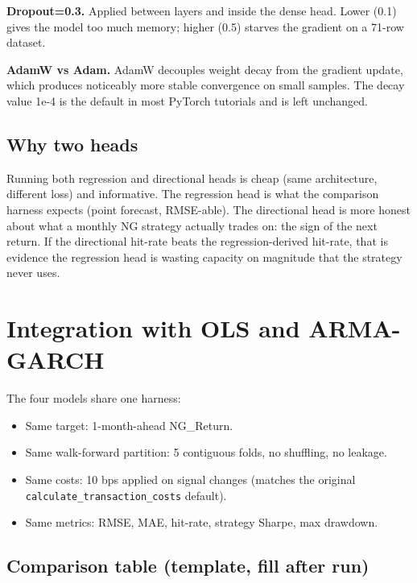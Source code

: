 \documentclass[11pt,letterpaper]{article}
\begin{document}
\textbf{Dropout=0.3.} Applied between layers and inside the dense head. Lower (0.1) gives the model too much memory; higher (0.5) starves the gradient on a 71-row dataset.

\textbf{AdamW vs Adam.} AdamW decouples weight decay from the gradient update, which produces noticeably more stable convergence on small samples. The decay value 1e-4 is the default in most PyTorch tutorials and is left unchanged.

\subsection{Why two heads}

Running both regression and directional heads is cheap (same architecture, different loss) and informative. The regression head is what the comparison harness expects (point forecast, RMSE-able). The directional head is more honest about what a monthly NG strategy actually trades on: the sign of the next return. If the directional hit-rate beats the regression-derived hit-rate, that is evidence the regression head is wasting capacity on magnitude that the strategy never uses.

\section{Integration with OLS and ARMA-GARCH}

The four models share one harness:

\begin{itemize}[leftmargin=*,nosep]
  \item Same target: 1-month-ahead NG\_Return.
  \item Same walk-forward partition: 5 contiguous folds, no shuffling, no leakage.
  \item Same costs: 10 bps applied on signal changes (matches the original \texttt{calculate\_transaction\_costs} default).
  \item Same metrics: RMSE, MAE, hit-rate, strategy Sharpe, max drawdown.
\end{itemize}

\subsection{Comparison table (template, fill after run)}
\end{document}
